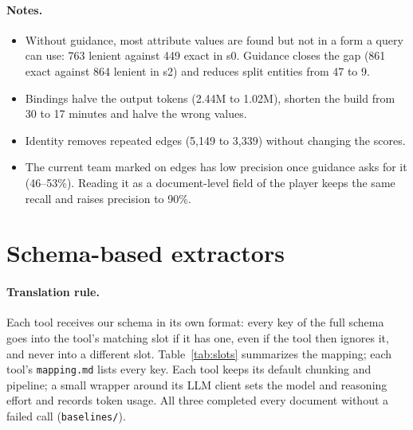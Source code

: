 \documentclass[11pt]{article}
\newcommand{\code}[1]{\texttt{#1}}
\begin{document}
\paragraph{Notes.}
\begin{itemize}
  \item Without guidance, most attribute values are found but not in a form a query can use: 763
    lenient against 449 exact in s0. Guidance closes the gap (861 exact against 864 lenient in s2)
    and reduces split entities from 47 to 9.
  \item Bindings halve the output tokens (2.44M to 1.02M), shorten the build from 30 to 17 minutes and
    halve the wrong values.
  \item Identity removes repeated edges (5,149 to 3,339) without changing the scores.
  \item The current team marked on edges has low precision once guidance asks for it (46--53\%).
    Reading it as a document-level field of the player keeps the same recall and raises precision
    to 90\%.
\end{itemize}

\section{Schema-based extractors}

\paragraph{Translation rule.} Each tool receives our schema in its own format: every key of the full
schema goes into the tool's matching slot if it has one, even if the tool then ignores it, and never
into a different slot. Table~\ref{tab:slots} summarizes the mapping; each tool's \code{mapping.md}
lists every key. Each tool keeps its default chunking and pipeline; a small wrapper around its LLM
client sets the model and reasoning effort and records token usage. All three completed every
document without a failed call (\code{baselines/}).
\end{document}
